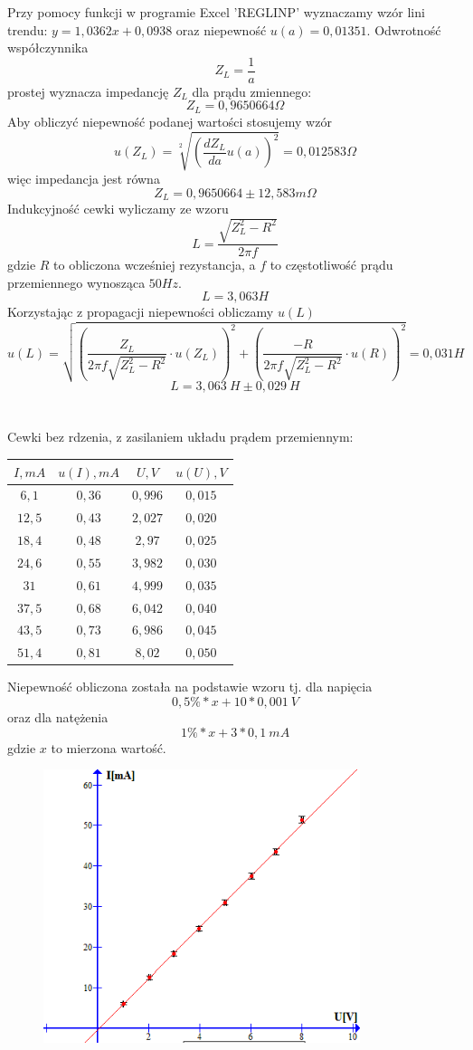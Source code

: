 \documentclass{article}
\begin{document}
Przy pomocy funkcji w programie Excel 'REGLINP' wyznaczamy wzór lini trendu: $y = 1,0362x + 0,0938$ oraz niepewność $u(a) = 0,01351$.
Odwrotność współczynnika 
$$Z_L = \frac{1}{a}$$
prostej wyznacza impedancję $Z_L$ dla prądu zmiennego:
$$Z_L = 0,9650664 \Omega$$ 
Aby obliczyć niepewność podanej wartości stosujemy wzór
$$u(Z_L) = \sqrt[2]{(\frac{dZ_L}{da}u(a))^2} = 0,012583 \Omega$$
więc impedancja jest równa
$$Z_L = 0,9650664 \pm 12,583 m \Omega$$
Indukcyjność cewki wyliczamy ze wzoru
$$L = \frac{\sqrt{Z_L^2-R^2}}{2\pi f}$$
gdzie $R$ to obliczona wcześniej rezystancja, a $f$ to częstotliwość prądu przemiennego wynosząca $50 Hz$.
$$L = 3,063 H$$
Korzystając z propagacji niepewności obliczamy $u(L)$
$$u(L) = \sqrt{(\frac{Z_L}{2\pi f \sqrt{Z_L^2 - R^2}} \cdot u(Z_L))^2+(\frac{-R}{2\pi f \sqrt{Z_L^2-R^2}} \cdot u(R))^2} = 0,031 H$$
$$L = 3,063\ H \pm 0,029\ H$$\\\\
Cewki bez rdzenia, z zasilaniem układu prądem przemiennym:
\begin{center}
    \begin{tabular}{|c|c|c|c|}
    \hline
$I,mA$ & $u(I), mA$ & $U,V$ & $u(U), V$\\ \hline
$6,1$ & $0,36$ & $0,996$ & $0,015$\\ \hline
$12,5$ & $0,43$ & $2,027$ & $0,020$\\ \hline
$18,4$ & $0,48$ & $2,97$ & $0,025$\\ \hline
$24,6$ & $0,55$ & $3,982$ & $0,030$\\ \hline
$31$ & $0,61$ & $4,999$ & $0,035$\\ \hline
$37,5$ & $0,68$ & $6,042$ & $0,040$\\ \hline
$43,5$ & $0,73$ & $6,986$ & $0,045$\\ \hline
$51,4$ & $0,81$ & $8,02$ & $0,050$\\ \hline
    \end{tabular}
\end{center}
Niepewność obliczona została na podstawie wzoru tj. dla napięcia
$$0,5\% * x + 10 * 0,001\ V $$
oraz dla natężenia
$$1\% * x + 3 * 0,1\ mA$$
gdzie $x$ to mierzona wartość.
\begin{figure}[ht]
\centering
\includegraphics[height=8cm]{wykres_3.png}
\end{figure}\\
\end{document}
